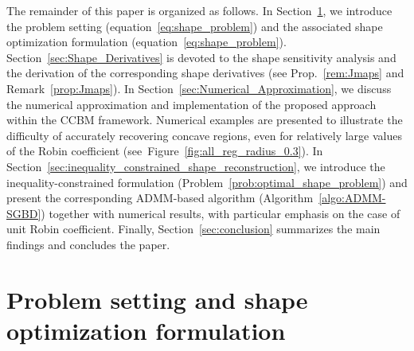 \documentclass[a4paper,11pt]{article}
\begin{document}
\color{black}
The remainder of this paper is organized as follows. 
In Section~\ref{sec:problem_setting}, we introduce the problem setting (equation~\ref{eq:shape_problem}) and the associated shape optimization formulation (equation~\ref{eq:shape_problem}). 
Section~\ref{sec:Shape_Derivatives} is devoted to the shape sensitivity analysis and the derivation of the corresponding shape derivatives (see Prop.~\ref{rem:Jmaps} and Remark~\ref{prop:Jmaps}). 
In Section~\ref{sec:Numerical_Approximation}, we discuss the numerical approximation and implementation of the proposed approach within the CCBM framework. 
Numerical examples are presented to illustrate the difficulty of accurately recovering concave regions, even for relatively large values of the Robin coefficient (see~Figure~\ref{fig:all_reg_radius_0.3}). 
In Section~\ref{sec:inequality_constrained_shape_reconstruction}, we introduce the inequality-constrained formulation (Problem~\ref{prob:optimal_shape_problem}) and present the corresponding ADMM-based algorithm (Algorithm~\ref{algo:ADMM-SGBD}) together with numerical results, with particular emphasis on the case of unit Robin coefficient. 
Finally, Section~\ref{sec:conclusion} summarizes the main findings and concludes the paper.
\medskip

%
%
\section{Problem setting and shape optimization formulation}
\label{sec:problem_setting}
\end{document}
